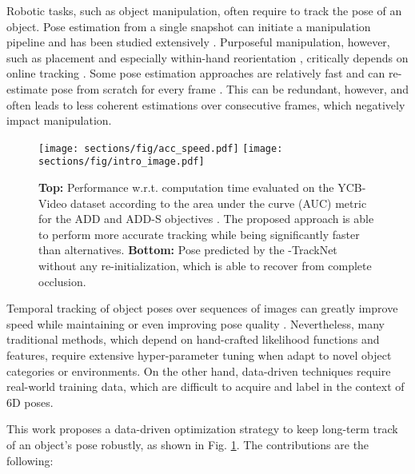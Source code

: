 \documentclass[letterpaper, 10 pt, conference]{ieeeconf}
\begin{document}
Robotic tasks, such as object manipulation, often require to track the pose of an object.  Pose estimation from a single snapshot can initiate a manipulation pipeline and has been
studied extensively \cite{xiang2017posecnn, deng2019poserbpf, mitash2019scene,deng2019self, 
issac2016depth, sundermeyer2018implicit,wang2019densefusion,li2019cdpn,he2020pvn3d}. Purposeful manipulation, however, such as placement and especially within-hand reorientation \cite{kimmel2019belief}, critically depends on online tracking \cite{mitash2020task}.  Some pose estimation approaches are relatively fast and can re-estimate pose from scratch for every frame \cite{tremblay2018deep, wang2019densefusion, sundermeyer2018implicit,wen2020robust}. This can be redundant, however, and often leads to less coherent estimations over consecutive frames, which negatively impact manipulation. 

\begin{figure}[t]
  \centering
  \texttt{[image: sections/fig/acc\_speed.pdf]}
  \texttt{[image: sections/fig/intro\_image.pdf]}
  \vspace{-.3in}
\caption{\textbf{Top:} Performance w.r.t. computation time evaluated on
the YCB-Video dataset according to the area under the curve (AUC)
metric for the ADD and ADD-S objectives \cite{xiang2017posecnn}. The
proposed approach is able to perform more accurate tracking while
being significantly faster than alternatives. \textbf{Bottom:} Pose
predicted by the -TrackNet without any re-initialization, which is
able to recover from complete occlusion.}
\label{fig:acc_speed}
  \vspace{-.3in}
\end{figure}

Temporal tracking of object poses over sequences of images can greatly
improve speed while maintaining or even improving pose
quality \cite{Wthrich2013ProbabilisticOT, schmidt2014dart}. Nevertheless, many
traditional methods, which depend on hand-crafted likelihood functions
and features, require extensive hyper-parameter tuning when adapt to 
novel object categories or environments. On the other hand,
data-driven techniques \cite{li2018deepim,garon2017deep} require 
real-world training data, which are difficult to acquire and
label in the context of 6D poses.

This work proposes a data-driven optimization strategy to keep long-term track of an object's pose robustly, as shown in Fig. \ref{fig:acc_speed}. The
contributions are the following:
\end{document}
